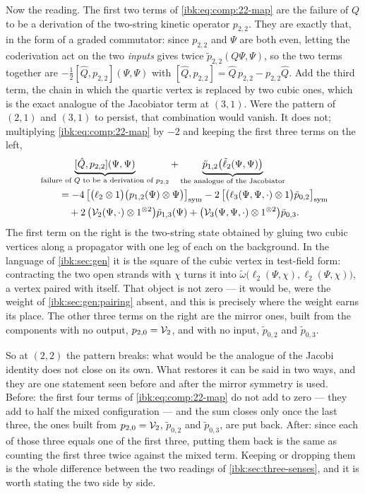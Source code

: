 Now the reading. The first two terms of \eqref{ibk:eq:comp:22-map} are the failure of $Q$ to be a derivation of the two-string kinetic operator $p_{2,2}$. They are exactly that, in the form of a graded commutator: since $p_{2,2}$ and $\Psi$ are both even, letting the coderivation act on the two \emph{inputs} gives twice $\tilde p_{2,2}(Q\Psi,\Psi)$, so the two terms together are $-\tfrac12[\hat Q,p_{2,2}](\Psi,\Psi)$ with $[\hat Q,p_{2,2}]=\hat Q\,p_{2,2}-p_{2,2}\hat Q$. Add the third term, the chain in which the quartic vertex is replaced by two cubic ones, which is the exact analogue of the Jacobiator term at $(3,1)$. Were the pattern of $(2,1)$ and $(3,1)$ to persist, that combination would vanish. It does not; multiplying \eqref{ibk:eq:comp:22-map} by $-2$ and keeping the first three terms on the left,
\begin{equation}
  \label{ibk:eq:comp:22-reading}
  \begin{split}
    &\underbrace{[\hat Q,p_{2,2}](\Psi,\Psi)}_{\text{failure of }Q\text{ to be a derivation of }p_{2,2}}
      + \underbrace{\tilde p_{1,2}\bigl(\tilde\ell_2(\Psi,\Psi)\bigr)}_{\text{the analogue of the Jacobiator}}
    \\
    &\qquad
      = -4\,\bigl[\bigl(\ell_2\otimes1\bigr)\bigl(p_{1,2}(\Psi)\otimes\Psi\bigr)\bigr]_{\rm sym}
        - 2\,\bigl[\bigl(\ell_3(\Psi,\Psi,\cdot)\otimes1\bigr)\tilde p_{0,2}\bigr]_{\rm sym}
    \\
    &\qquad\quad
      + 2\,\bigl({\mathcal{V}}_2(\Psi,\cdot)\otimes1^{\otimes2}\bigr)\tilde p_{1,3}(\Psi)
      + \bigl({\mathcal{V}}_3(\Psi,\Psi,\cdot)\otimes1^{\otimes2}\bigr)\tilde p_{0,3}.
  \end{split}
\end{equation}
The first term on the right is the two-string state obtained by gluing two cubic vertices along a propagator with one leg of each on the background. In the language of \cref{ibk:sec:gen} it is the square of the cubic vertex in test-field form: contracting the two open strands with $\chi$ turns it into $\tilde\omega\bigl(\ell_2(\Psi,\chi),\ell_2(\Psi,\chi)\bigr)$, a vertex paired with itself. That object is not zero --- it would be, were the weight of \cref{ibk:sec:gen:pairing} absent, and this is precisely where the weight earns its place. The other three terms on the right are the mirror ones, built from the components with no output, $p_{2,0}={\mathcal{V}}_2$, and with no input, $\tilde p_{0,2}$ and $\tilde p_{0,3}$.

So at $(2,2)$ the pattern breaks: what would be the analogue of the Jacobi identity does not close on its own. What restores it can be said in two ways, and they are one statement seen before and after the mirror symmetry is used. Before: the first four terms of \eqref{ibk:eq:comp:22-map} do not add to zero --- they add to half the mixed configuration --- and the sum closes only once the last three, the ones built from $p_{2,0}={\mathcal{V}}_2$, $\tilde p_{0,2}$ and $\tilde p_{0,3}$, are put back. After: since each of those three equals one of the first three, putting them back is the same as counting the first three twice against the mixed term. Keeping or dropping them is the whole difference between the two readings of \cref{ibk:sec:three-senses}, and it is worth stating the two side by side.

